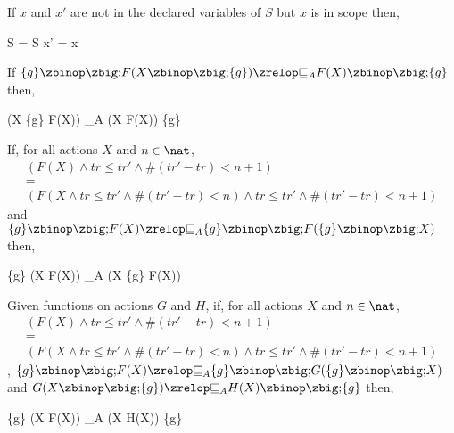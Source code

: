 \ActionRenameLaw*

\begin{law}
  \label{schema-action-fixed-var-intro-law}
  If $x$ and $x'$ are not in the declared variables of $S$ but $x$ is
  in scope then,
  \begin{circus}
    \lschexpract S \rschexpract = \lschexpract S \land x' = x \rschexpract
  \end{circus}
\end{law}

\begin{law}
  \label{rec-assump-distr-law}
  If $\{g\} \circseq F(X \circseq \{g\}) \circrefines_A F(X) \circseq \{g\}$ then,
  \begin{circus}
    (\circmu X \circspot \{g\} \circseq F(X))
    \circrefines_A
    (\circmu X \circspot F(X)) \circseq \{g\}
  \end{circus}
\end{law}

\begin{law}
  \label{assump-rec-distl-law}
  If, for all actions $X$ and $n \in \nat$,
  \[\begin{array}{l}
      (F(X) \land tr \leq tr' \land \# (tr'-tr) < n + 1) \\
      {} = {} \\
      (F(X \land tr \leq tr' \land \# (tr'-tr) < n) \land tr \leq tr' \land \# (tr'-tr) < n + 1)
    \end{array}\]
  and $\{g\} \circseq F(X) \circrefines_A \{g\} \circseq F(\{g\} \circseq X)$ then,
  \begin{circus}
    \{g\} \circseq (\circmu X \circspot F(X))
    \circrefines_A
    (\circmu X \circspot \{g\} \circseq F(X))
  \end{circus}
\end{law}

\begin{law}
  \label{assump-rec-dist-refine-law}
  Given functions on actions $G$ and $H$,
  if, for all actions $X$ and $n \in \nat$,
  \[\begin{array}{l}
      (F(X) \land tr \leq tr' \land \# (tr'-tr) < n + 1) \\
      {} = {} \\
      (F(X \land tr \leq tr' \land \# (tr'-tr) < n) \land tr \leq tr' \land \# (tr'-tr) < n + 1)
    \end{array}\],
  $\{g\} \circseq F(X) \circrefines_A \{g\} \circseq G(\{g\} \circseq
  X)$ and $G(X \circseq \{g\}) \circrefines_A H(X) \circseq \{g\}$
  then,
  \begin{circus}
    \{g\} \circseq (\circmu X \circspot F(X))
    \circrefines_A
    (\circmu X \circspot H(X)) \circseq \{g\}
  \end{circus}
\end{law}

